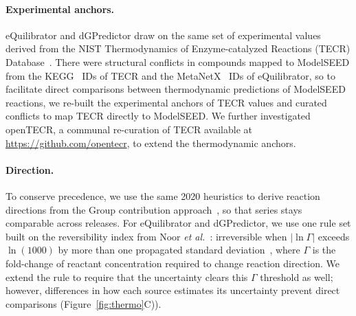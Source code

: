\paragraph{Experimental anchors.} eQuilibrator and dGPredictor draw on the same set of experimental values derived from the NIST Thermodynamics of Enzyme-catalyzed Reactions (TECR) Database~\cite{goldberg2004}.
There were structural conflicts in compounds mapped to ModelSEED from the KEGG~\cite{kanehisa2023} IDs of TECR and the MetaNetX~\cite{moretti2021} IDs of eQuilibrator, so to facilitate direct comparisons between thermodynamic predictions of ModelSEED reactions, we re-built the experimental anchors of TECR values and curated conflicts to map TECR directly to ModelSEED.
We further investigated openTECR, a communal re-curation of TECR available at \url{https://github.com/opentecr}, to extend the thermodynamic anchors.

\paragraph{Direction.} To conserve precedence, we use the same 2020 heuristics to derive reaction directions from the Group contribution approach~\cite{jankowski2008}, so that series stays comparable across releases.
For eQuilibrator and dGPredictor, we use one rule set built on the reversibility index from Noor \textit{et al.}~\cite{noor2012}: irreversible when $|\ln\Gamma|$ exceeds $\ln(1000)$ by more than one propagated standard deviation~\cite{beber2022}, where $\Gamma$ is the fold-change of reactant concentration required to change reaction direction.
We extend the rule to require that the uncertainty clears this $\Gamma$ threshold as well; however, differences in how each source estimates its uncertainty prevent direct comparisons (Figure~\ref{fig:thermo}C)).